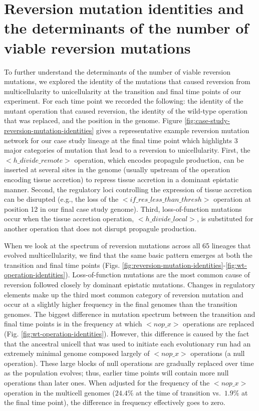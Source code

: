 \documentclass[
]{book}
\begin{document}
\hypertarget{reversion-mutation-identities-and-the-determinants-of-the-number-of-viable-reversion-mutations}{%
\section{Reversion mutation identities and the determinants of the number of viable reversion mutations}\label{reversion-mutation-identities-and-the-determinants-of-the-number-of-viable-reversion-mutations}}

To further understand the determinants of the number of viable reversion mutations, we explored the identity of the mutations that caused reversion from multicellularity to unicellularity at the transition and final time points of our experiment. For each time point we recorded the following: the identity of the mutant operation that caused reversion, the identity of the wild-type operation that was replaced, and the position in the genome. Figure \ref{fig:case-study-reversion-mutation-identities} gives a representative example reversion mutation network for our case study lineage at the final time point which highlights 3 major categories of mutation that lead to a reversion to unicellularity. First, the \(<h\_divide\_remote>\) operation, which encodes propagule production, can be inserted at several sites in the genome (usually upstream of the operation encoding tissue accretion) to repress tissue accretion in a dominant epistatic manner. Second, the regulatory loci controlling the expression of tissue accretion can be disrupted (e.g., the loss of the \(<if\_res\_less\_than\_thresh>\) operation at position 12 in our final case study genome). Third, loss-of-function mutations occur when the tissue accretion operation, \(<h\_divide\_local>\), is substituted for another operation that does not disrupt propagule production.

When we look at the spectrum of reversion mutations across all 65 lineages that evolved multicellularity, we find that the same basic pattern emerges at both the transition and final time points (Figs. \ref{fig:reversion-mutation-identities}-\ref{fig:wt-operation-identities}). Loss-of-function mutations are the most common cause of reversion followed closely by dominant epistatic mutations. Changes in regulatory elements make up the third most common category of reversion mutation and occur at a slightly higher frequency in the final genomes than the transition genomes. The biggest difference in mutation spectrum between the transition and final time points is in the frequency at which \(<nop\_x>\) operations are replaced (Fig. \ref{fig:wt-operation-identities}). However, this difference is caused by the fact that the ancestral unicell that was used to initiate each evolutionary run had an extremely minimal genome composed largely of \(<nop\_x>\) operations (a null operation). These large blocks of null operations are gradually replaced over time as the population evolves; thus, earlier time points will contain more null operations than later ones. When adjusted for the frequency of the \(<nop\_x>\) operation in the multicell genomes (\(24.4\%\) at the time of transition vs.~\(1.9\%\) at the final time point), the difference in frequency effectively goes to zero.
\end{document}
